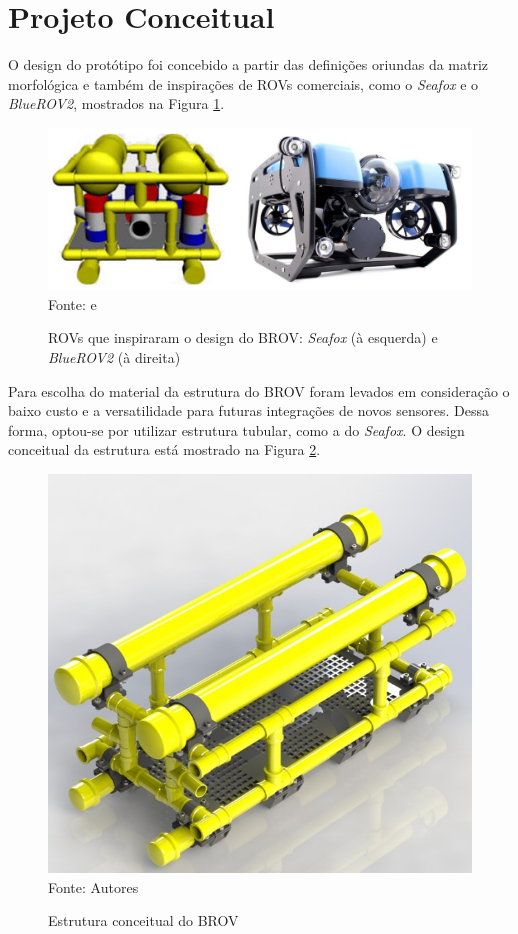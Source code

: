 \section{Projeto Conceitual}
\label{sec:projeto-conceitual}

O design do protótipo foi concebido a partir das definições oriundas da matriz morfológica e também de inspirações de ROVs comerciais, como o \textit{Seafox} e o \textit{BlueROV2}, mostrados na Figura \ref{fig:seafoxbluerov2}.

\begin{figure}[h]
	\centering
	\caption[ROVs que inspiraram o design do BROV]{ROVs que inspiraram o design do BROV: \textit{Seafox} (à esquerda) e \textit{BlueROV2} (à direita)}
	\label{fig:seafoxbluerov2}
	\includegraphics[width=0.8\linewidth]{images/seafox_bluerov2}\\
	\footnotesize Fonte: \cite{Rocha2014} e \cite{bluerov2}
	
\end{figure}

Para escolha do material da estrutura do BROV foram levados em consideração o baixo custo e a versatilidade para futuras integrações de novos sensores. Dessa forma, optou-se por utilizar estrutura tubular, como a do \textit{Seafox}. O design conceitual da estrutura está mostrado na Figura \ref{fig:brov-frame}.

\begin{figure}[h]
	\centering
	\caption{Estrutura conceitual do BROV}
	\label{fig:brov-frame}
	\includegraphics[width=0.7\linewidth]{images/brov-frame}\\
	\footnotesize Fonte: Autores
\end{figure}

